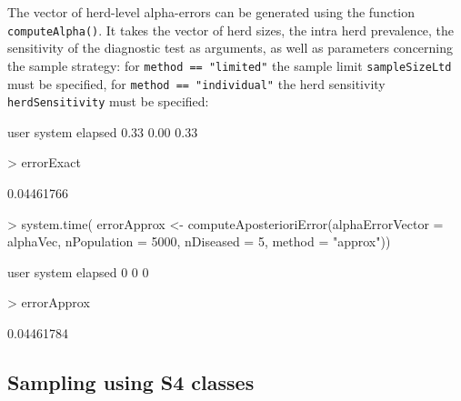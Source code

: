 \documentclass[nojss]{jss}
\begin{document}
The vector of herd-level alpha-errors can be generated using the 
function \texttt{computeAlpha()}.  It 
takes the vector of herd sizes, the intra herd prevalence, the 
sensitivity of the diagnostic test as arguments, as well as 
parameters concerning the sample strategy: for \texttt{method == 
"limited"} the sample limit \texttt{sampleSizeLtd} must be 
specified, for \texttt{method == "individual"} the herd sensitivity 
\texttt{herdSensitivity} must be specified:

\begin{Schunk}
\begin{Soutput}
   user  system elapsed 
   0.33    0.00    0.33 
\end{Soutput}
\begin{Sinput}
> errorExact    
\end{Sinput}
\begin{Soutput}
[1] 0.04461766
\end{Soutput}
\begin{Sinput}
> system.time({
   errorApprox <- computeAposterioriError(alphaErrorVector = alphaVec, 
       nPopulation = 5000, nDiseased = 5, method = "approx")})
\end{Sinput}
\begin{Soutput}
   user  system elapsed 
      0       0       0 
\end{Soutput}
\begin{Sinput}
> errorApprox
\end{Sinput}
\begin{Soutput}
[1] 0.04461784
\end{Soutput}
\end{Schunk}



\subsection{Sampling using S4 classes} 
\label{subsec:sampling_with_class}
\end{document}
